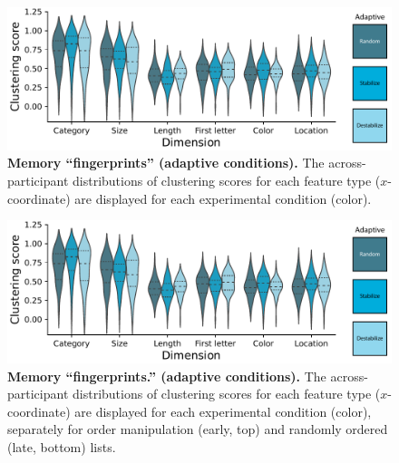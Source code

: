\documentclass{article}
\begin{document}
\begin{figure}[tp] \centering
    \includegraphics[width=\textwidth]{figures/fingerprints_adaptive}
    
    \caption{\textbf{Memory ``fingerprints'' (adaptive conditions).}
    The across-participant distributions of clustering scores for each feature
    type ($x$-coordinate) are displayed for each experimental condition
    (color).}
        \label{fig:fingerprints-adaptive}
\end{figure}

\begin{figure}[tp] \centering
    \includegraphics[width=\textwidth]{figures/fingerprints_adaptive}
    
    \caption{\textbf{Memory ``fingerprints.'' (adaptive conditions).}
    The across-participant distributions of clustering scores for each feature
    type ($x$-coordinate) are displayed for each experimental condition
    (color), separately for order manipulation (early, top) and randomly
    ordered (late, bottom) lists.}
        \label{fig:fingerprints-adaptive}
\end{figure}
\end{document}
